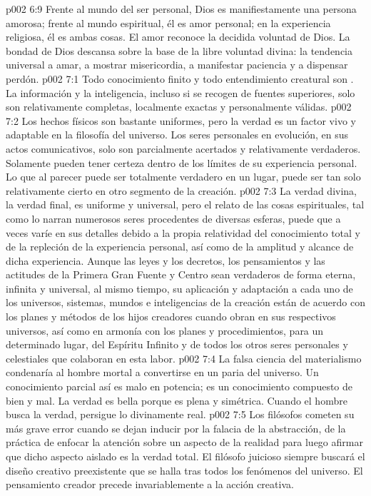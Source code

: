\vs p002 6:9 \pc Frente al mundo del ser personal, Dios es manifiestamente una persona amorosa; frente al mundo espiritual, él es amor personal; en la experiencia religiosa, él es ambas cosas. El amor reconoce la decidida voluntad de Dios. La bondad de Dios descansa sobre la base de la libre voluntad divina: la tendencia universal a amar, a mostrar misericordia, a manifestar paciencia y a dispensar perdón.
\vs p002 7:1 Todo conocimiento finito y todo entendimiento creatural son . La información y la inteligencia, incluso si se recogen de fuentes superiores, solo son relativamente completas, localmente exactas y personalmente válidas.
\vs p002 7:2 Los hechos físicos son bastante uniformes, pero la verdad es un factor vivo y adaptable en la filosofía del universo. Los seres personales en evolución, en sus actos comunicativos, solo son parcialmente acertados y relativamente verdaderos. Solamente pueden tener certeza dentro de los límites de su experiencia personal. Lo que al parecer puede ser totalmente verdadero en un lugar, puede ser tan solo relativamente cierto en otro segmento de la creación.
\vs p002 7:3 La verdad divina, la verdad final, es uniforme y universal, pero el relato de las cosas espirituales, tal como lo narran numerosos seres procedentes de diversas esferas, puede que a veces varíe en sus detalles debido a la propia relatividad del conocimiento total y de la repleción de la experiencia personal, así como de la amplitud y alcance de dicha experiencia. Aunque las leyes y los decretos, los pensamientos y las actitudes de la Primera Gran Fuente y Centro sean verdaderos de forma eterna, infinita y universal, al mismo tiempo, su aplicación y adaptación a cada uno de los universos, sistemas, mundos e inteligencias de la creación están de acuerdo con los planes y métodos de los hijos creadores cuando obran en sus respectivos universos, así como en armonía con los planes y procedimientos, para un determinado lugar, del Espíritu Infinito y de todos los otros seres personales y celestiales que colaboran en esta labor.
\vs p002 7:4 \pc La falsa ciencia del materialismo condenaría al hombre mortal a convertirse en un paria del universo. Un conocimiento parcial así es malo en potencia; es un conocimiento compuesto de bien y mal. La verdad es bella porque es plena y simétrica. Cuando el hombre busca la verdad, persigue lo divinamente real.
\vs p002 7:5 Los filósofos cometen su más grave error cuando se dejan inducir por la falacia de la abstracción, de la práctica de enfocar la atención sobre un aspecto de la realidad para luego afirmar que dicho aspecto aislado es la verdad total. El filósofo juicioso siempre buscará el diseño creativo preexistente que se halla tras todos los fenómenos del universo. El pensamiento creador precede invariablemente a la acción creativa.
